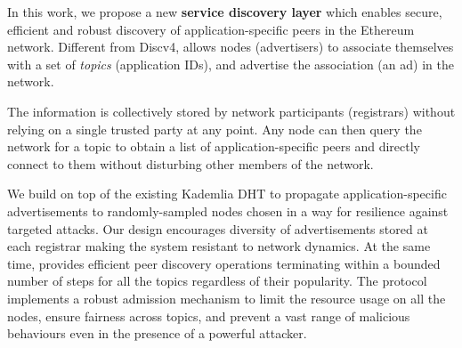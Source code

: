 
 In this work, we propose a new \textbf{service discovery layer} which enables secure,  efficient and robust discovery of application-specific peers in the Ethereum network.
Different from Discv4, \sysname allows nodes (\ie advertisers) to associate themselves with a set of \emph{topics} (\eg application IDs), and advertise the association (\ie an ad) in the network. 

The information is collectively stored by network participants (\ie registrars) without relying on a single trusted party at any point. Any node can then query the network for a topic to obtain a list of application-specific peers and directly connect to them without disturbing other members of the network. 

We build \sysname on top of the existing Kademlia DHT to propagate application-specific advertisements to randomly-sampled nodes chosen in a way for resilience against targeted attacks. Our design encourages diversity of advertisements stored at each registrar making the system resistant to network dynamics. At the same time, \sysname provides efficient peer discovery operations terminating within a bounded number of steps  for all the topics regardless of their popularity. The protocol implements a robust admission mechanism to limit the resource usage on all the nodes, ensure fairness across topics, and prevent a vast range of malicious behaviours even in the presence of a powerful attacker.

